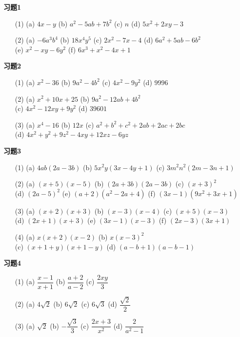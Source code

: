 \documentclass[a4paper,12pt]{ctexart}
\begin{document}
\newpage
{}

\textbf{习题1}
\begin{enumerate}
\item[(1)] (a) $4x-y$ \qquad (b) $a^2-5ab+7b^2$ \qquad (c) $n$ \qquad (d) $5x^2+2xy-3$
\item[(2)] (a) $-6a^3b^4$ \qquad (b) $18x^4y^5$ \qquad (c) $2x^2-7x-4$ \qquad (d) $6a^2+5ab-6b^2$ \\ \qquad (e) $x^2-xy-6y^2$ \qquad (f) $6x^3+x^2-4x+1$
\end{enumerate}

\textbf{习题2}
\begin{enumerate}
\item[(1)] (a) $x^2-36$ \qquad (b) $9a^2-4b^2$ \qquad (c) $4x^2-9y^2$ \qquad (d) $9996$
\item[(2)] (a) $x^2+10x+25$ \qquad (b) $9a^2-12ab+4b^2$ \\ \qquad (c) $4x^2-12xy+9y^2$ \qquad (d) $39601$
\item[(3)] (a) $x^4-16$ \qquad (b) $12x$ \qquad (c) $a^2+b^2+c^2+2ab+2ac+2bc$ \\ \qquad (d) $4x^2+y^2+9z^2-4xy+12xz-6yz$
\end{enumerate}

\textbf{习题3}
\begin{enumerate}
\item[(1)] (a) $4ab(2a-3b)$ \qquad (b) $5x^2y(3x-4y+1)$ \qquad (c) $3m^2n^2(2m-3n+1)$
\item[(2)] (a) $(x+5)(x-5)$ \qquad (b) $(2a+3b)(2a-3b)$ \qquad (c) $(x+3)^2$ \\ \qquad (d) $(2a-5)^2$ \qquad (e) $(a+2)(a^2-2a+4)$ \qquad (f) $(3x-1)(9x^2+3x+1)$
\item[(3)] (a) $(x+2)(x+3)$ \qquad (b) $(x-3)(x-4)$ \qquad (c) $(x+5)(x-3)$ \\ \qquad (d) $(2x+1)(x+3)$ \qquad (e) $(3x-1)(x-3)$ \qquad (f) $(2x-3)(3x+1)$
\item[(4)] (a) $x(x+2)(x-2)$ \qquad (b) $x(x-3)^2$ \\ \qquad (c) $(x+1+y)(x+1-y)$ \qquad (d) $(a-b+1)(a-b-1)$
\end{enumerate}

\textbf{习题4}
\begin{enumerate}
\item[(1)] (a) $\dfrac{x-1}{x+1}$ \qquad (b) $\dfrac{a+2}{a-2}$ \qquad (c) $\dfrac{2xy}{3}$
\item[(2)] (a) $4\sqrt2$ \qquad (b) $6\sqrt2$ \qquad (c) $6\sqrt3$ \qquad (d) $\dfrac{\sqrt2}{2}$
\item[(3)] (a) $\sqrt2$ \qquad (b) $-\dfrac{\sqrt3}{3}$ \qquad (c) $\dfrac{2x+3}{x^2}$ \qquad (d) $\dfrac{2}{a^2-1}$
\end{enumerate}
\end{document}
